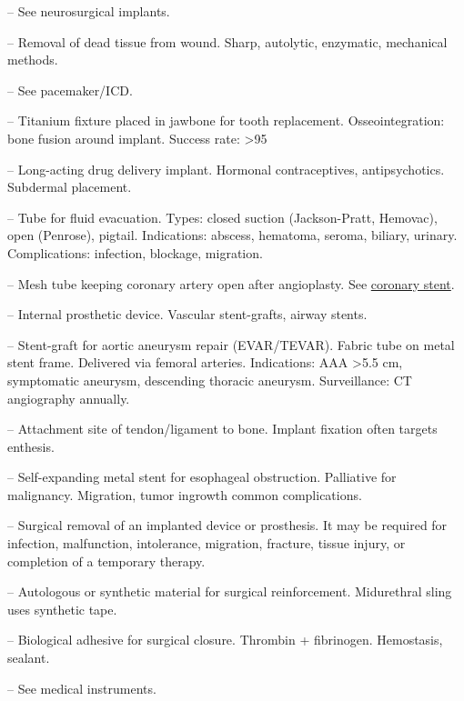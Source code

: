-- See neurosurgical implants.

-- Removal of dead tissue from wound. Sharp, autolytic, enzymatic, mechanical methods.

-- See pacemaker/ICD.

-- Titanium fixture placed in jawbone for tooth replacement. Osseointegration: bone fusion around implant. Success rate: >95%

-- Long-acting drug delivery implant. Hormonal contraceptives, antipsychotics. Subdermal placement.


-- Tube for fluid evacuation. Types: closed suction (Jackson-Pratt, Hemovac), open (Penrose), pigtail. Indications: abscess, hematoma, seroma, biliary, urinary. Complications: infection, blockage, migration.

-- Mesh tube keeping coronary artery open after angioplasty. See \hyperlink{Coronary Stent}{coronary stent}.

-- Internal prosthetic device. Vascular stent-grafts, airway stents.

-- Stent-graft for aortic aneurysm repair (EVAR/TEVAR). Fabric tube on metal stent frame. Delivered via femoral arteries. Indications: AAA >5.5 cm, symptomatic aneurysm, descending thoracic aneurysm. Surveillance: CT angiography annually.

-- Attachment site of tendon/ligament to bone. Implant fixation often targets enthesis.


-- Self-expanding metal stent for esophageal obstruction. Palliative for malignancy. Migration, tumor ingrowth common complications.

-- Surgical removal of an implanted device or prosthesis. It may be required for infection, malfunction, intolerance, migration, fracture, tissue injury, or completion of a temporary therapy.

-- Autologous or synthetic material for surgical reinforcement. Midurethral sling uses synthetic tape.


-- Biological adhesive for surgical closure. Thrombin + fibrinogen. Hemostasis, sealant.

-- See medical instruments.

